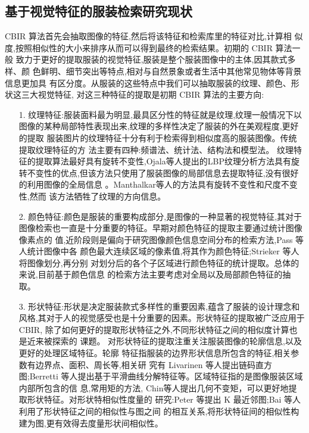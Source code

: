 \subsection{基于视觉特征的服装检索研究现状}

CBIR 算法首先会抽取图像的特征,然后将该特征和检索库里的特征对比,计算相
似度,按照相似性的大小来排序从而可以得到最终的检索结果。初期的 CBIR 算法一般
致力于更好的提取服装的视觉特征,服装是整个服装图像中的主体,因其款式多样、颜
色鲜明、细节突出等特点,相对与自然景象或者生活中其他常见物体等背景信息更加具
有区分度。从服装的这些特点中我们可以抽取服装的纹理、颜色、形状这三大视觉特征,
对这三种特征的提取是初期 CBIR 算法的主要方向:
\begin{itemize}
\item[1.]纹理特征:服装面料最为明显,最具区分性的特征就是纹理,纹理一般情况下以
图像的某种局部特性表现出来,纹理的多样性决定了服装的外在美观程度,更好的提取
服装图片的纹理特征十分有利于检索得到相似度高的服装图像。传统提取纹理特征的方
法主要有四种:频谱法、统计法、结构法和模型法。
纹理特征的提取算法最好具有旋转不变性,Ojala等人提出的LBP纹理分析方法具有旋转不变性的优点,但该方法只使用了服装图像的局部信息去提取特征,没有很好
的利用图像的全局信息\cite{ojala2002multiresolution}
。Manthalkar等人的方法具有旋转不变性和尺度不变性,然而
该方法牺牲了纹理的方向信息\cite{manthalkar2003rotation}。

\item[2.] 颜色特征:颜色是服装的重要构成部分,是图像的一种显著的视觉特征,其对于
图像检索也一直是十分重要的特征。早期对颜色特征的提取主要通过统计图像像素点的
值,近阶段则是偏向于研究图像颜色信息空间分布的检索方法,Pass 等人统计图像中各
颜色最大连续区域的像素值,将其作为颜色特征\cite{pass1996comparing};Strieker 等人将图像划分,再分别
对划分后的各个子区域进行颜色特征的统计提取\cite{stricker1997spectral}。总体的来说,目前基于颜色信息
的检索方法主要考虑对全局以及局部颜色特征的抽取。

\item[3.] 形状特征:形状是决定服装款式多样性的重要因素,蕴含了服装的设计理念和
风格,其对于人的视觉感受也是十分重要的因素。形状特征的提取被广泛应用于 CBIR,
除了如何更好的提取形状特征之外,不同形状特征之间的相似度计算也是近来被探索的
课题。
对形状特征的提取注重关注服装图像的轮廓信息,以及更好的处理区域特征。轮廓
特征指服装的边界形状信息所包含的特征,相关参数有边界点、面积、周长等,相关研
究有 Livarinen 等人提出链码直方图\cite{iivarinen1997comparison};Berretti
等人提出基于平滑曲线分解特征等\cite{berretti2000retrieval}。区域特征指的是图像服装区域内部所包含的信
息,常用矩的方法, Chin等人提出几何不变矩，可以更好地提取形状特征\cite{teh1988image}。对形状特相似性度量的
研究:Peter 等提出 K 最近邻图\cite{kontschieder2009beyond};Bai 等人利用了形状特征之间的相似性与图之间
的相互关系,将形状特征间的相似性构建为图,更有效得去度量形状间相似性\cite{bai2010learning}。

\end{itemize}

